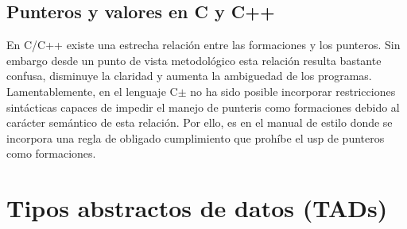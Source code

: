 \documentclass[11pt,a4paper]{article}
\begin{document}
  \subsection{Punteros y valores en C y C++}
  En C/C++ existe una estrecha relación entre las formaciones y los punteros. Sin embargo desde un punto de vista metodológico esta relación resulta bastante confusa, disminuye la claridad y aumenta la ambiguedad de los programas. Lamentablemente, en el lenguaje C$\pm$ no ha sido posible incorporar restricciones sintácticas capaces de impedir el manejo de punteris como formaciones debido al carácter semántico de esta relación. Por ello, es en el manual de estilo donde se incorpora una regla de obligado cumplimiento que prohíbe el usp de punteros como formaciones.
  \section{Tipos abstractos de datos (TADs)}
  
 
 
	 	
	 	
	
	
	
	
	
	
	
	
	
	
	
	
\end{document}
